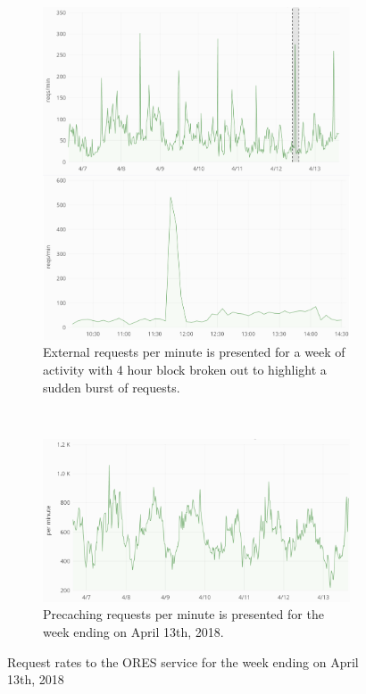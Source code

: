 \begin{figure}[h]
\centering
\begin{subfigure}[t]{\textwidth}
  \centering
  \includegraphics[width=.6\textwidth]{figures/ORES_request_activity_201804_week_vs_4hours}
  \caption{External requests per minute is presented for a week of activity with 4 hour block broken out to highlight a sudden burst of requests.}
  \label{fig:ores_request_rate}
\end{subfigure}\\
\begin{subfigure}[t]{\columnwidth}
  \centering
  \includegraphics[width=.6\textwidth]{figures/ORES_precache_request_rate_201804}
  \caption{Precaching requests per minute is presented for the week ending on April 13th, 2018.}
  \label{fig:ores_precache_rate}
\end{subfigure}
\caption{Request rates to the ORES service for the week ending on April 13th, 2018}
\label{fig:ores_activity}
\end{figure}
